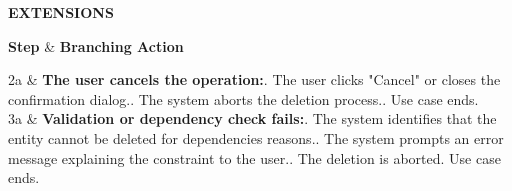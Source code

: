 \documentclass[12pt, a4paper]{article}
\newenvironment{ucextensions}{
    \noindent\textbf{EXTENSIONS} \par \vspace{0.1cm}
    \noindent
    \renewcommand{\arraystretch}{1.3}
    \tabularx{\textwidth}{|>{\centering\arraybackslash}p{1.2cm}|X|}
    \hline
    \rowcolor{gray!30}
    \textbf{Step} & \textbf{Branching Action} \\ \hline
}{
    \endtabularx
    \par\vspace{0.3cm}
}
\begin{document}
\begin{ucextensions}
    2a & \textbf{The user cancels the operation:}. The user clicks "Cancel" or closes the confirmation dialog.. The system aborts the deletion process.. Use case ends. \\ \hline
    3a & \textbf{Validation or dependency check fails:}. The system identifies that the entity cannot be deleted for dependencies reasons.. The system prompts an error message explaining the constraint to the user.. The deletion is aborted. Use case ends. \\ \hline
\end{ucextensions}
\end{document}
